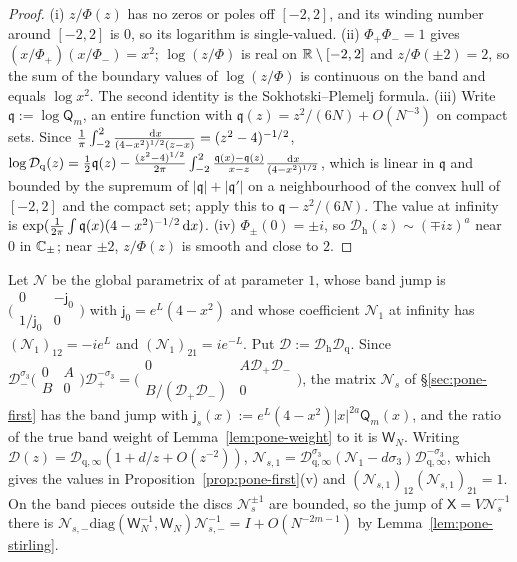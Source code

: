 \begin{proof}
(i) $z/\Phi(z)$ has no zeros or poles off $[-2,2]$, and its winding number around $[-2,2]$ is $0$, so its logarithm is
single-valued. (ii) $\Phi_+\Phi_-=1$ gives $(x/\Phi_+)(x/\Phi_-)=x^2$; $\log(z/\Phi)$ is real on $\mathbb{R}\setminus[-2,2]$ and
$z/\Phi(\pm2)=2$, so the sum of the boundary values of $\log(z/\Phi)$ is continuous on the band and equals $\log x^2$.
The second identity is the Sokhotski--Plemelj formula. (iii) Write $\mathfrak q:=\log\mathsf Q_m$, an entire function with
$\mathfrak q(z)=z^2/(6N)+O(N^{-3})$ on compact sets. Since $\frac1\pi\int_{-2}^2\frac{\,\mathrm{d} x}{(4-x^2)^{1/2}(z-x)}=(z^2-4)^{-1/2}$,
$\log\mathcal D_{\mathrm q}(z)=\frac12\mathfrak q(z)-\frac{(z^2-4)^{1/2}}{2\pi}\int_{-2}^2\frac{\mathfrak q(x)-\mathfrak q(z)}{x-z}
\frac{\,\mathrm{d} x}{(4-x^2)^{1/2}}$, which is linear in $\mathfrak q$ and bounded by the supremum of $|\mathfrak q|+|\mathfrak q'|$ on a
neighbourhood of the convex hull of $[-2,2]$ and the compact set; apply this to $\mathfrak q-z^2/(6N)$. The value at
infinity is $\exp(\frac1{2\pi}\int\mathfrak q(x)(4-x^2)^{-1/2}\,\mathrm{d} x)$. (iv) $\Phi_\pm(0)=\pm i$, so
$\mathcal D_{\mathrm h}(z)\sim(\mp iz)^a$ near $0$ in $\mathbb{C}_\pm$; near $\pm2$, $z/\Phi(z)$ is smooth and close to $2$.
\end{proof}

Let $\mathcal N$ be the global parametrix of \cite[(5.11)]{WLXZ} at parameter $1$, whose band jump is
$\bigl(\begin{smallmatrix}0&-\mathsf j_0\\1/\mathsf j_0&0\end{smallmatrix}\bigr)$ with $\mathsf j_0=e^L(4-x^2)$ and whose coefficient
$\mathcal N_1$ at infinity has $(\mathcal N_1)_{12}=-ie^L$ and $(\mathcal N_1)_{21}=ie^{-L}$. Put $\mathcal D:=\mathcal D_{\mathrm h}
\mathcal D_{\mathrm q}$. Since $\mathcal D_-^{\sigma_3}\bigl(\begin{smallmatrix}0&A\\B&0\end{smallmatrix}\bigr)\mathcal D_+^{-\sigma_3}=
\bigl(\begin{smallmatrix}0&A\mathcal D_+\mathcal D_-\\B/(\mathcal D_+\mathcal D_-)&0\end{smallmatrix}\bigr)$, the matrix $\mathcal N_s$ of
\S\ref{sec:pone-first} has the band jump with $\mathsf j_s(x):=e^L(4-x^2)|x|^{2a}\mathsf Q_m(x)$, and the ratio of the true
band weight of Lemma~\ref{lem:pone-weight} to it is $\mathsf W_N$. Writing $\mathcal D(z)=\mathcal D_{\mathrm q,\infty}(1+d/z+O(z^{-2}))$,
$\mathcal N_{s,1}=\mathcal D_{\mathrm q,\infty}^{\sigma_3}(\mathcal N_1-d\sigma_3)\mathcal D_{\mathrm q,\infty}^{-\sigma_3}$, which gives the
values in Proposition~\ref{prop:pone-first}(v) and $(\mathcal N_{s,1})_{12}(\mathcal N_{s,1})_{21}=1$. On the band pieces outside
the discs $\mathcal N_s^{\pm1}$ are bounded, so the jump of $\mathsf X=V\mathcal N_s^{-1}$ there is
$\mathcal N_{s,-}\mathrm{diag}(\mathsf W_N^{-1},\mathsf W_N)\mathcal N_{s,-}^{-1}=I+O(N^{-2m-1})$ by Lemma~\ref{lem:pone-stirling}.


